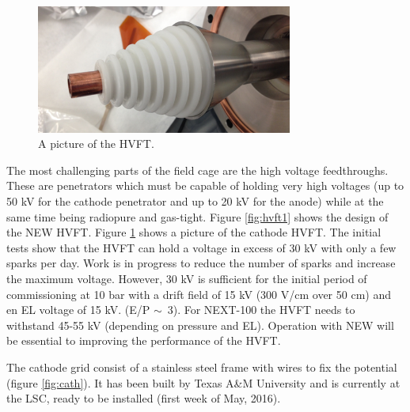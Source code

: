 \begin{figure}[hpt!]
\centering
\includegraphics[width=0.75\textwidth]{img2/HVFT2.png}
\caption{A picture of the HVFT.} \label{fig:hvft_tip}
\end{figure}


The most challenging parts of the field cage are the high voltage feedthroughs. These are penetrators which must be capable of holding very high voltages (up to 50 kV for the cathode penetrator and up to 20 kV for the anode) while at the same time being radiopure and gas-tight. Figure \ref{fig:hvft1} shows the design of the NEW HVFT. Figure 
\ref{fig:hvft_tip} shows a picture of the cathode HVFT. The initial tests show that the HVFT can hold a voltage in excess of 30 kV with only a few sparks per day. Work is in progress to reduce the number of sparks and increase the maximum voltage. However, 30 kV is sufficient for the initial period of commissioning at 10 bar with a drift field of 15 kV (300 V/cm over 50 cm) and en EL voltage of 15 kV. (E/P $\sim$~3). For NEXT-100 the HVFT needs to withstand 45-55 kV (depending on pressure and EL). Operation with NEW will be essential to improving the performance of the HVFT. 

The cathode grid consist of a stainless steel frame with wires to fix the potential (figure \ref{fig:cath}). It has
been built by Texas A\&M University and is currently at the LSC, ready to be installed (first week of May, 2016).

